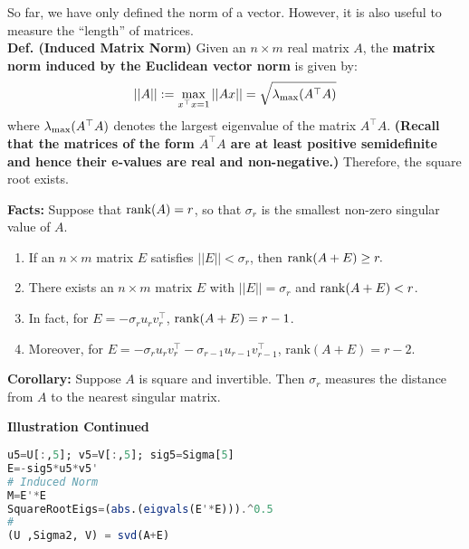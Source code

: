 \vspace*{.2cm}

So far, we have only defined the norm of a vector. However, it is also useful to measure the ``length'' of matrices. \\

\textbf{Def. (Induced Matrix Norm)} Given an $n \times m$ real matrix  $A$, the \textbf{matrix norm induced by the Euclidean vector norm} is given by:
$$||A|| :=\max_{x^\top x = 1} ||Ax|| = \sqrt{ \lambda_{\rm max}(A^\top A) }$$
where $\lambda_{\rm max}(A^\top A)$ denotes the largest eigenvalue of the matrix $A^\top A$. \textbf{ (Recall that the matrices of the form $A^\top A$ are at least positive semidefinite and hence their e-values are real and non-negative.) } Therefore, the square root exists.\\

\vspace*{.2cm}

\begin{tcolorbox}[title=\textbf{Numerical Rank}]


\textbf{Facts:} Suppose that $\mathrm{rank}(A) = r$, so that $\sigma_r$ is the smallest non-zero singular value of $A$. 

\begin{enumerate}
\setlength{\itemsep}{.1in}
\renewcommand{\labelenumi}{(\roman{enumi})}
\item If an $n \times m$ matrix $E$ satisfies $||E|| < \sigma_r$, then $\mathrm{rank}(A+E)\ge r.$

\item There exists an $n \times m$ matrix $E$ with $||E|| = \sigma_r$ and $\mathrm{rank}(A+E) < r$.

\item In fact, for $E=-\sigma_r u_r v_r^\top$,  $\mathrm{rank}(A+E) =r-1$.

\item Moreover, for $E=-\sigma_r u_r v_r^\top - \sigma_{r-1} u_{r-1} v_{r-1}^\top$,  $\text{rank}(A+E) =r-2$.

\end{enumerate}

\textbf{Corollary:}  Suppose $A$ is square and invertible. Then $\sigma_r$ measures the distance from $A$ to the nearest singular matrix.
\end{tcolorbox}


\textbf{Illustration Continued}

 \begin{lstlisting}[language=Julia]
u5=U[:,5]; v5=V[:,5]; sig5=Sigma[5]
E=-sig5*u5*v5'
# Induced Norm
M=E'*E
SquareRootEigs=(abs.(eigvals(E'*E))).^0.5
#
(U ,Sigma2, V) = svd(A+E)
\end{lstlisting}

